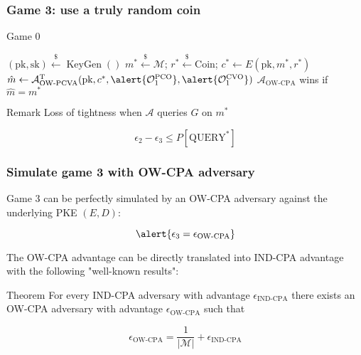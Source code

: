 \documentclass{beamer}
\newcommand{\leftsample}{\overset{{\scriptscriptstyle\$}}{\leftarrow}}
\begin{document}
\begin{frame}
    \frametitle{Game 3: use a truly random coin}

    \begin{algorithm}[H]
        \SetAlgoLined
        \caption{Game 0}

        $(\text{pk}, \text{sk}) \leftsample \operatorname{KeyGen}()$\;
        $m^\ast \leftsample \mathcal{M}$;
        \alert{
            $r^\ast \leftsample \text{Coin}$;
            $c^\ast \leftarrow E(\text{pk}, m^\ast, r^\ast)$
        }\;
        $\hat{m} \leftarrow \mathcal{A}^\text{T}_\text{OW-PCVA}(
            \text{pk}, c^\ast,
            \alert{\mathcal{O}^\text{PCO}_1},
            \alert{\mathcal{O}^\text{CVO}_1}
        )$\;
        $\mathcal{A}_\text{OW-CPA}$ wins if $\hat{m} = m^\ast$
    \end{algorithm}

    \begin{block}{Remark}
        Loss of tightness when $\mathcal{A}$ queries $G$ on $m^\ast$

        \begin{equation*}
            \epsilon_2 - \epsilon_3 \leq P[\text{QUERY}^\ast]
        \end{equation*}
    \end{block}
\end{frame}

\begin{frame}
    \frametitle{Simulate game 3 with OW-CPA adversary}

    Game 3 can be perfectly simulated by an OW-CPA adversary against the underlying PKE $(E, D)$:

    \begin{equation*}
        \alert{\epsilon_3 = \epsilon_\text{OW-CPA}}
    \end{equation*}

    The OW-CPA advantage can be directly translated into IND-CPA advantage with the following "well-known results":

    \begin{block}{Theorem}
        For every IND-CPA adversary with advantage $\epsilon_\text{IND-CPA}$ there exists an OW-CPA adversary with advantage $\epsilon_\text{OW-CPA}$ such that

        \begin{equation*}
            \epsilon_\text{OW-CPA} 
            = \frac{1}{\vert\mathcal{M}\vert} + \epsilon_\text{IND-CPA}
        \end{equation*}
    \end{block}
\end{frame}
\end{document}
